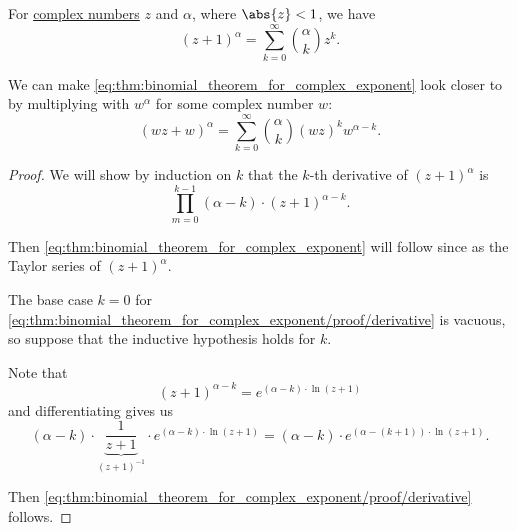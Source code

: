 \begin{theorem}\label{thm:binomial_theorem_for_complex_exponent}
  For \hyperref[def:complex_numbers]{complex numbers} \( z \) and \( \alpha \), where \( \abs{z} < 1 \), we have
  \begin{equation}\label{eq:thm:binomial_theorem_for_complex_exponent}
    (z + 1)^\alpha = \sum_{k=0}^\infty \binom \alpha k z^k.
  \end{equation}
\end{theorem}
\begin{comments}
  \item We can make \eqref{eq:thm:binomial_theorem_for_complex_exponent} look closer to  by multiplying with \( w^\alpha \) for some complex number \( w \):
  \begin{equation*}
    ({wz} + w)^\alpha = \sum_{k=0}^\infty \binom \alpha k (wz)^k w^{\alpha - k}.
  \end{equation*}
\end{comments}
\begin{proof}
  We will show by induction on \( k \) that the \( k \)-th derivative of \( (z + 1)^\alpha \) is
  \begin{equation}\label{eq:thm:binomial_theorem_for_complex_exponent/proof/derivative}
    \prod_{m=0}^{k-1} (\alpha - k) \cdot (z + 1)^{\alpha - k}.
  \end{equation}

  Then \eqref{eq:thm:binomial_theorem_for_complex_exponent} will follow since as the Taylor series of \( (z + 1)^\alpha \).

  The base case \( k = 0 \) for \eqref{eq:thm:binomial_theorem_for_complex_exponent/proof/derivative} is vacuous, so suppose that the inductive hypothesis holds for \( k \).

  Note that
  \begin{equation*}
    (z + 1)^{\alpha - k} = e^{(\alpha - k) \cdot \ln(z + 1)}
  \end{equation*}
  and differentiating gives us
  \begin{equation*}
    (\alpha - k) \cdot \underbrace{\frac 1 {z + 1}}_{(z + 1)^{-1}} \cdot e^{(\alpha - k) \cdot \ln(z + 1)}
    =
    (\alpha - k) \cdot e^{(\alpha - (k + 1)) \cdot \ln(z + 1)}.
  \end{equation*}

  Then \eqref{eq:thm:binomial_theorem_for_complex_exponent/proof/derivative} follows.
\end{proof}

